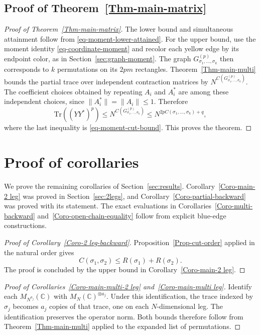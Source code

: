 \documentclass[12pt]{article}
\numberwithin{equation}{section}
\theoremstyle{plain}
\def\bC{\mathbb C}
\def\Tr{\mathrm {Tr}}
\begin{document}
\subsection{Proof of Theorem~\ref{Thm-main-matrix}}

\begin{proof}[Proof of Theorem~\ref{Thm-main-matrix}]
The lower bound and simultaneous attainment follow from \eqref{eq-moment-lower-attained}. For the upper bound, use the moment identity \eqref{eq-coordinate-moment} and recolor each yellow edge by its endpoint color, as in Section~\ref{sec:graph-moment}. The graph $G^{(p)}_{\sigma_1,\ldots,\sigma_k}$ then corresponds to $k$ permutations on its $2pm$ rectangles. Theorem~\ref{Thm-main-multi} bounds the partial trace over independent contraction matrices by $N^{C(G^{(p)}_{\sigma_1,\ldots,\sigma_k})}$. The coefficient choices obtained by repeating $A_i$ and $A_i^*$ are among these independent choices, since $\|A_i^*\|=\|A_i\|\le1$. Therefore
\begin{equation}
\Tr((YY^*)^p)\le N^{C(G^{(p)}_{\sigma_1,\ldots,\sigma_k})}\le N^{2pC(\sigma_1,\ldots,\sigma_k)+q},
\end{equation}
where the last inequality is \eqref{eq-moment-cut-bound}. This proves the theorem.
\end{proof}

\section{Proof of corollaries} \label{sec:proof-coro}

We prove the remaining corollaries of Section~\ref{sec:results}. Corollary~\ref{Coro-main-2 leg} was proved in Section~\ref{sec:2legs}, and Corollary~\ref{Coro-partial-backward} was proved with its statement. The exact evaluations in Corollaries~\ref{Coro-multi-backward} and~\ref{Coro-open-chain-equality} follow from explicit blue-edge constructions.

\begin{proof}[Proof of Corollary~\ref{Coro-2 leg-backward}]
Proposition~\ref{Prop-cut-order} applied in the natural order gives
\[
C(\sigma_1,\sigma_2)\le R(\sigma_1)+R(\sigma_2).
\]
The proof is concluded by the upper bound in Corollary~\ref{Coro-main-2 leg}.
\end{proof}

\begin{proof}[Proof of Corollaries~\ref{Coro-main-multi-2 leg} and~\ref{Coro-main-multi leg}]
Identify each $M_{N^{a_j}}(\bC)$ with $M_N(\bC)^{\otimes a_j}$. Under this identification, the trace indexed by $\sigma_j$ becomes $a_j$ copies of that trace, one on each $N$-dimensional leg. The identification preserves the operator norm. Both bounds therefore follow from Theorem~\ref{Thm-main-multi} applied to the expanded list of permutations.
\end{proof}
\end{document}

